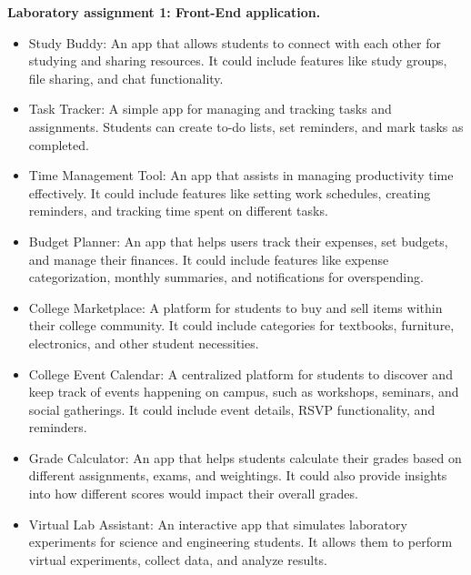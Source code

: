 
\pagebreak
\begin{center}
\textbf{Laboratory assignment 1: Front-End application.}
\end{center}

\medskip


\begin{itemize}
\item Study Buddy: An app that allows students to connect with each other for studying and sharing resources. It could include features like study groups, file sharing, and chat functionality.

\item Task Tracker: A simple app for managing and tracking tasks and assignments. Students can create to-do lists, set reminders, and mark tasks as completed.

\item Time Management Tool: An app that assists in managing productivity time effectively. It could include features like setting work schedules, creating reminders, and tracking time spent on different tasks.

\item Budget Planner: An app that helps users track their expenses, set budgets, and manage their finances. It could include features like expense categorization, monthly summaries, and notifications for overspending.

\item College Marketplace: A platform for students to buy and sell items within their college community. It could include categories for textbooks, furniture, electronics, and other student necessities.

\item College Event Calendar: A centralized platform for students to discover and keep track of events happening on campus, such as workshops, seminars, and social gatherings. It could include event details, RSVP functionality, and reminders.

\item Grade Calculator: An app that helps students calculate their grades based on different assignments, exams, and weightings. It could also provide insights into how different scores would impact their overall grades.

\item Virtual Lab Assistant: An interactive app that simulates laboratory experiments for science and engineering students. It allows them to perform virtual experiments, collect data, and analyze results.


\end{itemize}
